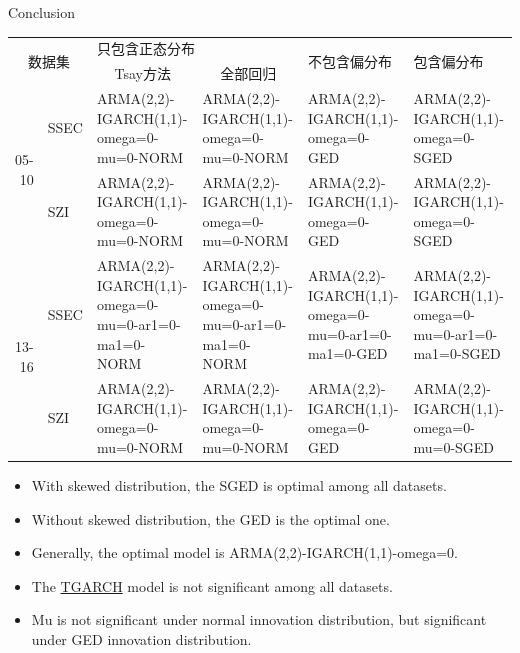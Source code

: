 \documentclass{beamer}
\begin{document}
\begin{frame}{Conclusion}
\begin{table}[htbp]
  \centering
  \tiny
    \begin{tabular}{rp{2em}p{12em}p{12em}p{8em}p{8em}}
    \toprule
    \multicolumn{2}{c}{\multirow{2}[4]{*}{数据集}} & \multicolumn{2}{C{26em}}{只包含正态分布} & \multirow{2}[4]{*}{不包含偏分布} & \multirow{2}[4]{*}{包含偏分布} \\
\cmidrule{3-4}    \multicolumn{2}{c}{} & \multicolumn{1}{c}{Tsay方法} & \multicolumn{1}{c}{全部回归} & \multicolumn{1}{c}{} & \multicolumn{1}{c}{} \\
    \midrule
    \multicolumn{1}{r}{\multirow{2}[4]{*}{05-10}} & SSEC & ARMA(2,2)-IGARCH(1,1)-omega=0-mu=0-NORM & ARMA(2,2)-IGARCH(1,1)-omega=0-mu=0-NORM & ARMA(2,2)-IGARCH(1,1)-omega=0-GED & ARMA(2,2)-IGARCH(1,1)-omega=0-SGED \\
\cmidrule{2-6}        & SZI & ARMA(2,2)-IGARCH(1,1)-omega=0-mu=0-NORM & ARMA(2,2)-IGARCH(1,1)-omega=0-mu=0-NORM & ARMA(2,2)-IGARCH(1,1)-omega=0-GED  & ARMA(2,2)-IGARCH(1,1)-omega=0-SGED \\
    \midrule
    \multicolumn{1}{r}{\multirow{2}[4]{*}{13-16}} & SSEC & ARMA(2,2)-IGARCH(1,1)-omega=0-mu=0-ar1=0-ma1=0-NORM & ARMA(2,2)-IGARCH(1,1)-omega=0-mu=0-ar1=0-ma1=0-NORM & ARMA(2,2)-IGARCH(1,1)-omega=0-mu=0-ar1=0-ma1=0-GED & ARMA(2,2)-IGARCH(1,1)-omega=0-mu=0-ar1=0-ma1=0-SGED \\
\cmidrule{2-6}        & SZI & ARMA(2,2)-IGARCH(1,1)-omega=0-mu=0-NORM & ARMA(2,2)-IGARCH(1,1)-omega=0-mu=0-NORM & ARMA(2,2)-IGARCH(1,1)-omega=0-GED & ARMA(2,2)-IGARCH(1,1)-omega=0-mu=0-SGED \\
    \bottomrule
    \end{tabular}%
  \label{tab:addlabel}%
\end{table}%

  \tiny
  \begin{itemize}
    \item With skewed distribution, the SGED is optimal among all datasets. 
    \item Without skewed distribution, the GED is the optimal one.
    \item Generally, the optimal model is ARMA(2,2)-IGARCH(1,1)-omega=0.  
    \item The \hypertarget{TGARCH back}{\hyperlink{TGARCH}{TGARCH}} model is not significant among all datasets.
    \item Mu is not significant under normal innovation distribution, but significant under GED innovation distribution.
  \end{itemize}
\end{frame}
\end{document}
